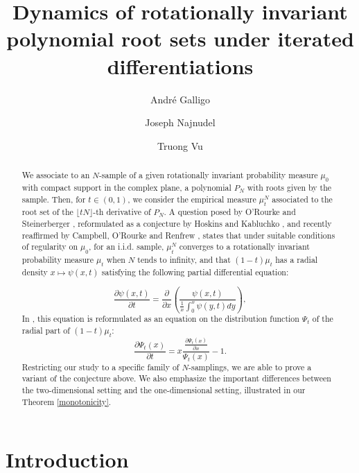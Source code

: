 \documentclass[11pt]{amsart}
\title{Dynamics of rotationally invariant polynomial root sets  under iterated differentiations}
\author{Andr\'e Galligo}
\author{Joseph Najnudel}
\author{Truong Vu}
\date{}
\begin{document}
\maketitle

 

\begin{abstract}
We associate to  an $N$-sample of a given rotationally invariant probability measure $\mu_0$ with compact support in the complex plane,  a polynomial $P_N$ with roots given by the sample. Then, for $t \in (0,1)$, we consider the empirical measure  $\mu_t^{N}$ associated to the root set of the $\lfloor t N\rfloor$-th derivative of  $P_N$. 
 A question posed by O'Rourke and Steinerberger \cite{o2021nonlocal}, reformulated as a conjecture by Hoskins and Kabluchko \cite{hoskins2021dynamics}, and recently reaffirmed by Campbell, O'Rourke and Renfrew \cite{campbell2024fractional}, states that under suitable conditions of regularity on $\mu_0$, for an i.i.d. sample, 
 $\mu_t^{N}$ converges to a rotationally invariant probability measure $\mu_t$  when $N$ tends to infinity, and that $(1-t)\mu_t$ has a radial density 
 $x \mapsto \psi(x,t)$ satisfying the following partial differential equation: 
 
	\begin{equation} \label{PDErotational}
		\frac{ \partial \psi(x,t) }{\partial t} = \frac{ \partial}{\partial x} \left( \frac{ \psi(x,t) }{ \frac{1}{x} \int_0^x \psi(y,t) dy } \right),
	\end{equation}
In \cite{hoskins2021dynamics}, this equation is reformulated as an equation 
on the distribution function $\Psi_t$ of the radial part of $(1-t) \mu_t$: 
\begin{equation}
\label{equationPsixtabstract}
\frac{\partial \Psi_t (x)}{\partial t} 
= x \frac{\frac{\partial \Psi_t (x)}{\partial x}  } {\Psi_t(x)} - 1. 
\end{equation}
Restricting our study to a specific family of $N$-samplings, we are able to prove a variant of the conjecture above. 
We also emphasize the important differences between the two-dimensional setting and the one-dimensional setting, illustrated in our Theorem \ref{monotonicity}.

\end{abstract}

\section{Introduction}\label{intro}
\end{document}
